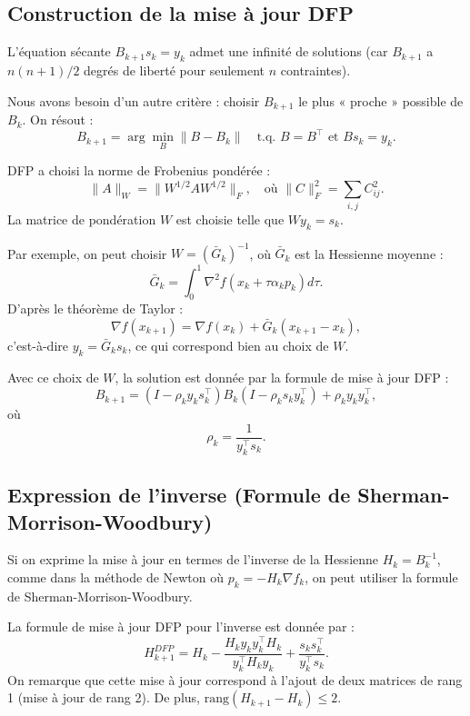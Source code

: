 \subsection{Construction de la mise à jour DFP}

L'équation sécante $B_{k+1} s_k = y_k$ admet une infinité de solutions (car $B_{k+1}$ a $n(n+1)/2$ degrés de liberté pour seulement $n$ contraintes).

Nous avons besoin d'un autre critère : choisir $B_{k+1}$ le plus « proche » possible de $B_k$.
On résout :
\begin{equation}
    B_{k+1} = \arg\min_B \|B - B_k\| \quad \text{t.q. } B=B^\top \text{ et } B s_k = y_k.
\end{equation}

DFP a choisi la norme de Frobenius pondérée :
\[
    \|A\|_W = \|W^{1/2} A W^{1/2}\|_F, \quad \text{où } \|C\|_F^2 = \sum_{i,j} C_{ij}^2.
\]
La matrice de pondération $W$ est choisie telle que $W y_k = s_k$.

Par exemple, on peut choisir $W = (\bar{G}_k)^{-1}$, où $\bar{G}_k$ est la Hessienne moyenne :
\[
    \bar{G}_k = \int_0^1 \nabla^2 f(x_k + \tau \alpha_k p_k) d\tau.
\]
D'après le théorème de Taylor :
\[
    \nabla f(x_{k+1}) = \nabla f(x_k) + \bar{G}_k (x_{k+1} - x_k),
\]
c'est-à-dire $y_k = \bar{G}_k s_k$, ce qui correspond bien au choix de $W$.

Avec ce choix de $W$, la solution est donnée par la formule de mise à jour DFP :
\begin{equation}
    \label{eq:dfp-formula}
    B_{k+1} = (I - \rho_k y_k s_k^\top) B_k (I - \rho_k s_k y_k^\top) + \rho_k y_k y_k^\top,
\end{equation}
où
\begin{equation}
    \rho_k = \frac{1}{y_k^\top s_k}.
\end{equation}

\subsection{Expression de l'inverse (Formule de Sherman-Morrison-Woodbury)}

Si on exprime la mise à jour en termes de l'inverse de la Hessienne $H_k = B_k^{-1}$, comme dans la méthode de Newton où $p_k = -H_k \nabla f_k$, on peut utiliser la formule de Sherman-Morrison-Woodbury.

La formule de mise à jour DFP pour l'inverse est donnée par :
\begin{equation}
    H_{k+1}^{DFP} = H_k - \frac{H_k y_k y_k^\top H_k}{y_k^\top H_k y_k} + \frac{s_k s_k^\top}{y_k^\top s_k}.
\end{equation}
On remarque que cette mise à jour correspond à l'ajout de deux matrices de rang 1 (mise à jour de rang 2).
De plus, $\text{rang}(H_{k+1} - H_k) \le 2$.

